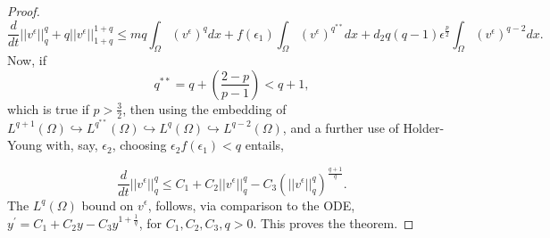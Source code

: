 \documentclass[10pt,a4paper]{amsart}
\begin{document}
\begin{proof}
\begin{equation}
\label{eq:in44}
 \frac{d}{dt}||v^{\epsilon}||^{q}_{q} 
+q||v^{\epsilon}||^{1+q}_{1+q} 
 \leq mq\int_{\Omega} (v^{\epsilon})^{q}dx +  f(\epsilon_{1})\int_{\Omega} (v^{\epsilon})^{q^{**}}dx + d_{2}  q(q-1) \epsilon^{\frac{p}{2}}\int_{\Omega} (v^{\epsilon})^{q-2} dx.
\end{equation}
Now, if 
\begin{equation}
    q^{**} = q + \left(\frac{2-p}{p-1}\right) < q+1, 
\end{equation} 
which is true if $p > \frac{3}{2}$,  then using the embedding of $L^{q+1}(\Omega) \hookrightarrow L^{q^{**}}(\Omega) \hookrightarrow L^{q}(\Omega) \hookrightarrow L^{q-2}(\Omega)$, and a further use of Holder-Young with, say, $\epsilon_{2}$, choosing $\epsilon_{2} f(\epsilon_{1}) < q$ entails,




\begin{equation}
 \frac{d}{dt}||v^{\epsilon}||^{q}_{q} \leq  C_{1} + C_{2}||v^{\epsilon}||^{q}_{q}
-C_{3}\left(||v^{\epsilon}||^{q}_{q}\right)^{\frac{q+1}{q}}.
\end{equation}
%
The $L^{q}(\Omega)$ bound on $v^{\epsilon}$, follows, via comparison to the ODE, $y^{'}=C_{1} + C_{2}y - C_{3}y^{1+\frac{1}{q}}$, for $C_{1}, C_{2}, C_{3}, q > 0$.
This proves the theorem.




\end{proof}
\end{document}

